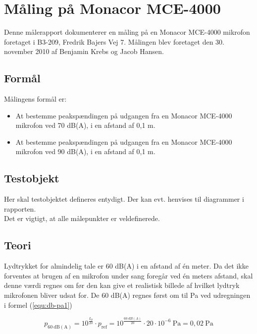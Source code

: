 


\chapter{Måling på Monacor MCE-4000}
\label{mic_output}
Denne målerapport dokumenterer en måling på en Monacor MCE-4000 mikrofon foretaget i B3-209, Fredrik Bajers Vej 7. Målingen blev foretaget den 30. november 2010 af Benjamin Krebs og Jacob Hansen.
\section{Formål}
\label{mic_output_formaal}
Målingens formål er:
\begin{itemize}
\item At bestemme peakspændingen på udgangen fra en Monacor MCE-4000 mikrofon ved 70 dB(A), i en afstand af 0,1 m.
\item At bestemme peakspændingen på udgangen fra en Monacor MCE-4000 mikrofon ved 90 dB(A), i en afstand af 0,1 m.
\end{itemize}
\section{Testobjekt}
\label{mic_output_testobjekt}
Her skal testobjektet defineres entydigt. Der kan evt. henvises til diagrammer i rapporten.\\
Det er vigtigt, at alle målepunkter er veldefinerede.\\

\section{Teori}
\label{mic_output_teori}
Lydtrykket for almindelig tale er 60 dB(A) i en afstand af én meter. Da det ikke forventes at brugen af en mikrofon under sang foregår ved én meters  afstand, skal denne værdi regnes om før den kan give et realistisk billede af hvilket lydtryk mikrofonen bliver udsat for. De 60 dB(A) regnes først om til Pa ved udregningen i formel (\ref{equ:db-pa1})

\begin{equation}
\label{equ:db-pa1}
p_{\mathrm{60~dB(A)}} = 10^{\frac{L_p}{20}} \cdot p_{\mathrm{ref}} = 10^{\frac{60~dB(A)}{20}} \cdot 20 \cdot 10^{-6}~\mathrm{Pa} = 0,02~\mathrm{Pa}
\end{equation}


